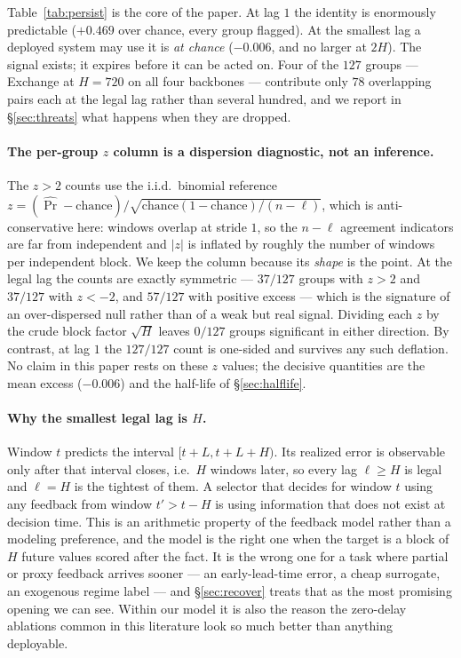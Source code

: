 \documentclass[a4paper,fleqn]{cas-sc}
\begin{document}
Table~\ref{tab:persist} is the core of the paper. At lag $1$ the identity is
enormously predictable ($+0.469$ over chance, every group flagged).
At the smallest lag a deployed system may use it is \emph{at chance}
($-0.006$, and no larger at $2H$). The signal exists; it expires before it can be
acted on. Four of the $127$ groups --- Exchange at $H{=}720$ on all four
backbones --- contribute only $78$ overlapping pairs each at the legal lag rather
than several hundred, and we report in \S\ref{sec:threats} what happens when they
are dropped.

\paragraph{The per-group $z$ column is a dispersion diagnostic, not an inference.}
The $z>2$ counts use the i.i.d.\ binomial reference
$z=(\widehat{\Pr}-\text{chance})/\sqrt{\text{chance}(1-\text{chance})/(n-\ell)}$,
which is anti-conservative here: windows overlap at stride $1$, so the $n-\ell$
agreement indicators are far from independent and $|z|$ is inflated by roughly
the number of windows per independent block. We keep the column because its
\emph{shape} is the point. At the legal lag the counts are exactly symmetric ---
$37/127$ groups with $z>2$ and $37/127$ with $z<-2$, and $57/127$ with positive
excess --- which is the signature of an over-dispersed null rather than of a
weak but real signal. Dividing each $z$ by the crude block factor $\sqrt{H}$
leaves $0/127$ groups significant in either direction. By contrast, at lag $1$
the $127/127$ count is one-sided and survives any such deflation. No claim in
this paper rests on these $z$ values; the decisive quantities are the mean
excess ($-0.006$) and the half-life of \S\ref{sec:halflife}.

\paragraph{Why the smallest legal lag is $H$.}
Window $t$ predicts the interval $[t+L, t+L+H)$. Its realized error is
observable only after that interval closes, i.e.\ $H$ windows later, so every lag
$\ell \ge H$ is legal and $\ell = H$ is the tightest of them. A selector
that decides for window $t$ using any feedback from window $t' > t-H$ is using
information that does not exist at decision time. This is an arithmetic property
of the feedback model rather than a modeling preference, and the model is the
right one when the target is a block of $H$ future values scored after the fact.
It is the wrong one for a task where partial or proxy feedback arrives sooner ---
an early-lead-time error, a cheap surrogate, an exogenous regime label --- and
\S\ref{sec:recover} treats that as the most promising opening we can see. Within
our model it is also the reason the zero-delay ablations common in this literature
look so much better than anything deployable.
\end{document}
